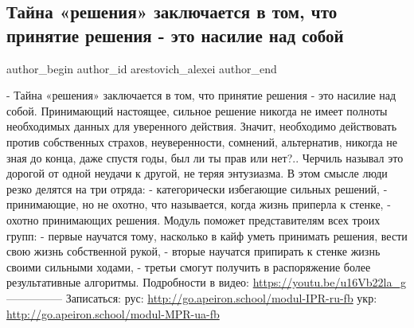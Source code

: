  
 
 
 
 
 
\subsection{Тайна «решения» заключается в том, что принятие решения - это насилие над собой}
\label{sec:30_05_2021.fb.arestovich_alexei.1.reshenie_psihologia}
\ifcmt
 author_begin
   author_id arestovich_alexei
 author_end
\fi

- Тайна «решения» заключается в том, что принятие решения - это насилие над собой.
Принимающий настоящее, сильное решение никогда не имеет полноты необходимых данных для уверенного действия. 
Значит, необходимо действовать против собственных страхов, неуверенности, сомнений, альтернатив, никогда не зная до конца, даже спустя годы, был ли ты прав или нет?..
Черчиль называл это дорогой от одной неудачи к другой, не теряя энтузиазма. 
В этом смысле люди резко делятся на три отряда:
- категорически избегающие сильных решений,
- принимающие, но не охотно, что называется, когда жизнь приперла к стенке,
- охотно принимающих решения.
Модуль поможет представителям всех троих групп:
- первые научатся тому, насколько в кайф уметь принимать решения, вести свою жизнь собственной рукой, 
- вторые научатся припирать к стенке жизнь своими сильными ходами, 
- третьи смогут получить в распоряжение более результативные алгоритмы.
Подробности в видео:
\url{https://youtu.be/u16Vb22la_g}
—————
Записаться: 
рус:
\url{http://go.apeiron.school/modul-IPR-ru-fb}
укр:
\url{http://go.apeiron.school/modul-MPR-ua-fb}
